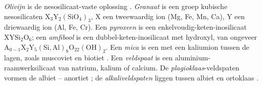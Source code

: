 \begin{definition}\label{def:b1:rock-forming-minerals:groups}
\emph{Olivijn} is de nesosilicaat-vaste oplossing . \emph{Granaat} is een groep
kubische nesosilicaten $\mathrm{X_3Y_2(SiO_4)_3}$, X een tweewaardig ion (Mg, Fe, Mn, Ca), Y een driewaardig ion (Al, Fe, Cr).
Een \emph{pyroxeen} is een enkelvoudig-keten-inosilicaat $\mathrm{XYSi_2O_6}$; een
\emph{amfibool} is een dubbel-keten-inosilicaat met hydroxyl, van ongeveer
$\mathrm{A_{0-1}X_2Y_5(Si,Al)_8O_{22}(OH)_2}$. Een \emph{mica} is een  met een kaliumion tussen de lagen,
zoals muscoviet  en biotiet . Een \emph{veldspaat} is een
aluminium-raamwerksilicaat van natrium, kalium of calcium. De \emph{plagioklaas}-veldspaten vormen de
 albiet  -- anortiet ; de \emph{alkaliveldspaten} liggen tussen
albiet en ortoklaas .
\end{definition}

